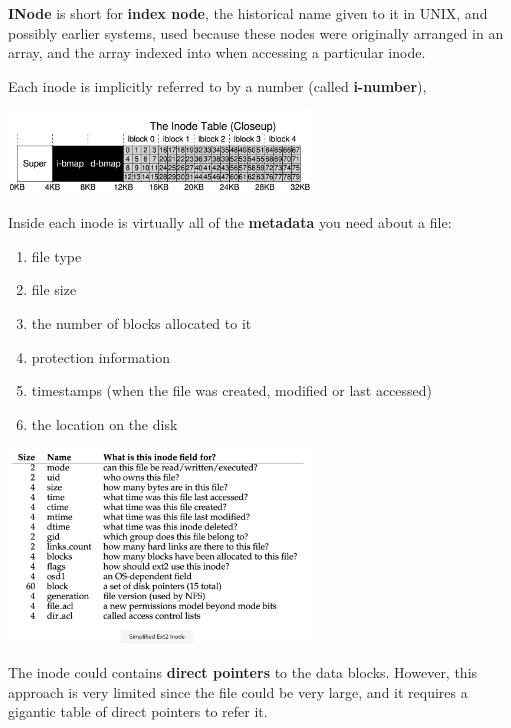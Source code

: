 
     \textbf{INode} is short for \textbf{index node}, the historical name 
     given to it in UNIX, and possibly earlier systems, used because these nodes
     were originally arranged in an array, and the array indexed into
     when accessing a particular inode.

     Each inode is implicitly referred to by a number (called \textbf{i-number}),

     \includegraphics[width=0.6\textwidth]{chapters/Persistence/persistence/inodes_organization.png}

     Inside each inode is virtually all of the \textbf{metadata} you need about a file:
     \begin{enumerate}
         \item file type
         \item file size
         \item the number of blocks allocated to it 
         \item protection information
         \item timestamps (when the file was created, modified or last accessed)
         \item the location on the disk
     \end{enumerate}
     
     \includegraphics[width=0.6\textwidth]{chapters/Persistence/persistence/inode_ext2.png}


     The inode could contains \textbf{direct pointers} to the data blocks. However, this 
     approach is very limited since the file could be very large, and it requires 
     a gigantic table of direct pointers to refer it.

